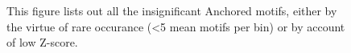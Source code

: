 \begin{figure}[htb]
    
    
    
    
    \label{fig:Rare_motifs}
    \caption{ This figure lists out all the insignificant Anchored motifs, either by the virtue of rare occurance (<5 mean motifs per bin) or by account of low Z-score. }
\end{figure}









